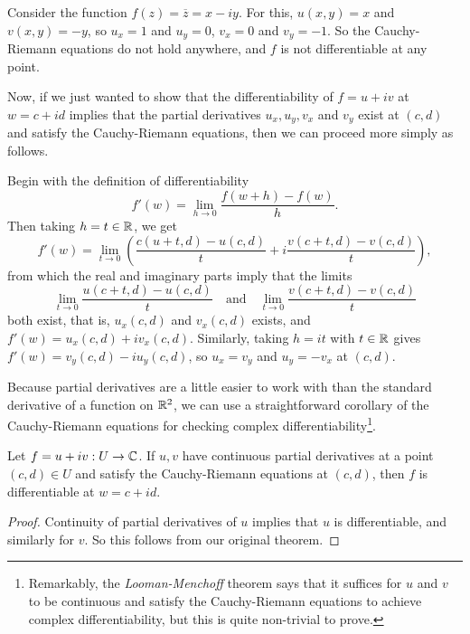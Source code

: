 \documentclass[a4paper]{scrartcl}
\begin{document}
\begin{example}
    Consider the function $f(z) = \overline{z} = x - iy$. For this, $u(x, y) = x$ and $v(x, y) = -y$, so $u_x = 1$ and $u_y = 0$, $v_x = 0$ and $v_y = -1$. So the Cauchy-Riemann equations do not hold anywhere, and $f$ is not differentiable at any point.
\end{example}

Now, if we just wanted to show that the differentiability of $f = u + iv$ at $w = c + id$ implies that the partial derivatives $u_x, u_y, v_x$ and $v_y$ exist at $(c, d)$ and satisfy the Cauchy-Riemann equations, then we can proceed more simply as follows. 

Begin with the definition of differentiability
$$
f'(w) = \lim_{h \to 0} \frac{f(w + h) - f(w)}{h}.
$$
Then taking $h = t \in \mathbb{R}$, we get
$$
f'(w) = \lim_{t \to 0} \left(
\frac{c(u + t, d) - u(c, d)}{t} + i \frac{v(c + t, d) - v(c, d)}{t}
\right),
$$
from which the real and imaginary parts imply that the limits
$$
\lim _{t \rightarrow 0} \frac{u(c+t, d)-u(c, d)}{t} \quad \text{and} \quad \lim_{t \rightarrow 0} \frac{v(c+t, d)-v(c, d)}{t}
$$
both exist, that is, $u_x(c, d)$ and $v_x(c, d)$ exists, and $f'(w) = u_x(c, d) + i v_x(c, d)$. 
Similarly, taking $h = it$ with $t \in \mathbb{R}$ gives $f'(w) = v_y(c, d) - i u_y(c, d)$, so $u_x = v_y$ and $u_y = -v_x$ at $(c, d)$.


Because partial derivatives are a little easier to work with than the standard derivative of a function on $\mathbb{R}^2$, we can use a straightforward corollary of the Cauchy-Riemann equations for checking complex differentiability\footnote{Remarkably, the \emph{Looman-Menchoff} theorem says that it suffices for $u$ and $v$ to be continuous and satisfy the Cauchy-Riemann equations to achieve complex differentiability, but this is quite non-trivial to prove.}.

\begin{corollary}
    Let $f = u + iv: U \rightarrow \mathbb{C}$. If $u, v$ have continuous partial derivatives at a point $(c ,d) \in U$ and satisfy the Cauchy-Riemann equations at $(c, d)$, then $f$ is differentiable at $w = c + id$.
\end{corollary}
\begin{proof}
    Continuity of partial derivatives of $u$ implies that $u$ is differentiable, and similarly for $v$. So this follows from our original theorem.
\end{proof}
\end{document}
